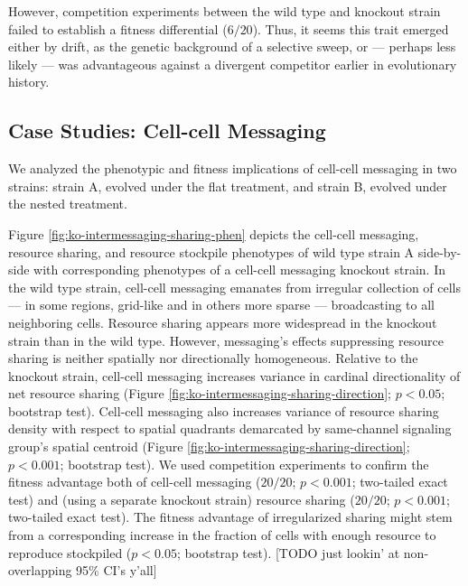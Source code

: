 However, competition experiments between the wild type and knockout strain failed to establish a fitness differential ($6/20$).
Thus, it seems this trait emerged either by drift, as the genetic background of a selective sweep, or --- perhaps less likely --- was advantageous against a divergent competitor earlier in evolutionary history.

\subsection{Case Studies: Cell-cell Messaging} \label{sec:cell-cell-messaging}



We analyzed the phenotypic and fitness implications of cell-cell messaging in two strains: strain A, evolved under the flat treatment, and strain B, evolved under the nested treatment.

Figure \ref{fig:ko-intermessaging-sharing-phen} depicts the cell-cell messaging, resource sharing, and resource stockpile phenotypes of wild type strain A side-by-side with corresponding phenotypes of a cell-cell messaging knockout strain.
In the wild type strain, cell-cell messaging emanates from irregular collection of cells --- in some regions, grid-like and in others more sparse --- broadcasting to all neighboring cells.
Resource sharing appears more widespread in the knockout strain than in the wild type.
However, messaging's effects suppressing resource sharing is neither spatially nor directionally homogeneous.
Relative to the knockout strain, cell-cell messaging increases variance in cardinal directionality of net resource sharing (Figure \ref{fig:ko-intermessaging-sharing-direction}; $p < 0.05$; bootstrap test).
Cell-cell messaging also increases variance of resource sharing density with respect to spatial quadrants demarcated by same-channel signaling group's spatial centroid (Figure \ref{fig:ko-intermessaging-sharing-direction}; $p < 0.001$; bootstrap test).
We used competition experiments to confirm the fitness advantage both of cell-cell messaging ($20/20$; $p < 0.001$; two-tailed exact test) and (using a separate knockout strain) resource sharing ($20/20$; $p < 0.001$; two-tailed exact test).
The fitness advantage of irregularized sharing might stem from a corresponding increase in the fraction of cells with enough resource to reproduce stockpiled ($p < 0.05$; bootstrap test).
[TODO just lookin' at non-overlapping 95\% CI's y'all]




